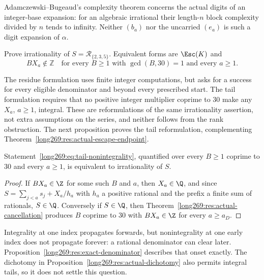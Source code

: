 Adamczewski--Bugeaud's complexity theorem
\cite[Theorem~1]{adamczewskibugeaud2007} concerns the actual digits of an
integer-base expansion: for an algebraic irrational their length-$n$ block
complexity divided by $n$ tends to infinity.  Neither $(b_a)$ nor the
uncarried $(e_a)$ is such a digit expansion of $\alpha$.


\begin{problem}
\label{long269:prob:producer}\label{long269:prob:tails269}
Prove irrationality of $S=\mathcal R_{\{2,3,5\}}$.  Equivalent forms are
$\Esc(K)$ and
\begin{equation}\label{long269:eq:tail-nonintegrality}
 BX_a\notin\mathbb Z
 \quad\text{for every }B\ge1\text{ with }\gcd(B,30)=1\text{ and every }a\ge1.
\end{equation}
\end{problem}
The residue formulation uses finite integer computations, but asks for a
success for every eligible denominator and beyond every prescribed start.
The tail formulation requires that no positive integer multiplier
coprime to $30$ make any $X_a$, $a\ge1$, integral.  These are
reformulations of the same irrationality assertion, not extra assumptions
on the series, and neither follows from the rank obstruction.  The next
proposition proves the tail reformulation, complementing
Theorem~\ref{long269:res:actual-escape-endpoint}.

\begin{proposition}
\label{long269:res:tails-equivalence}
Statement~\eqref{long269:eq:tail-nonintegrality}, quantified over every $B\ge1$
coprime to $30$ and every $a\ge1$, is equivalent to irrationality of $S$.
\end{proposition}

\begin{proof}
If $BX_a\in\Z$ for some such $B$ and $a$, then $X_a\in\Q$, and since
$S=\sum_{j<a}s_j+X_a/h_a$ with $h_a$ a positive rational and the prefix a
finite sum of rationals, $S\in\Q$.  Conversely if $S\in\Q$, then
Theorem~\ref{long269:res:actual-cancellation} produces $B$ coprime to $30$ with
$BX_a\in\Z$ for every $a\ge a_D$.
\end{proof}

Integrality at one index propagates forwards, but nonintegrality at one
early index does not propagate forever: a rational denominator can clear
later.  Proposition~\ref{long269:res:exact-denominator} describes that onset
exactly.  The dichotomy in Proposition~\ref{long269:res:actual-dichotomy}
also permits integral tails, so it does not settle this question.

